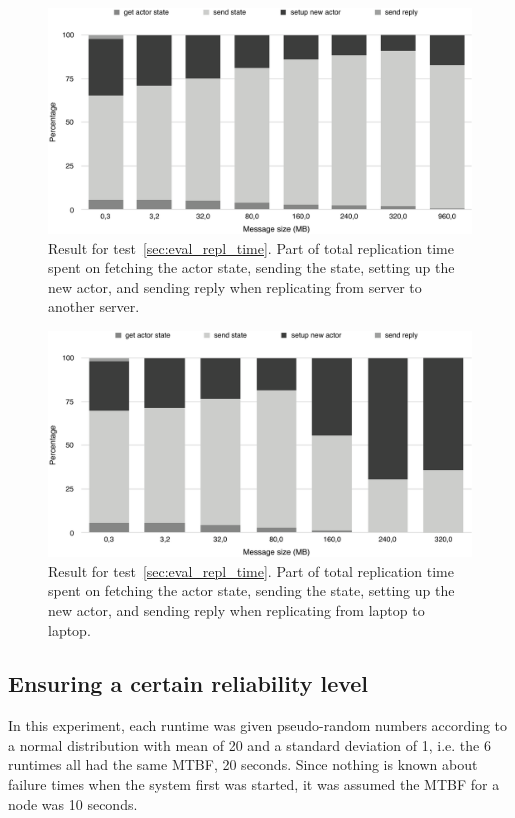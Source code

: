 \documentclass{cslthse-msc}
\begin{document}
\begin{figure}[!hbt]
\centering
\includegraphics[scale=0.5]{images/results/replication_time_percentages_server.pdf} 
\caption{Result for test~\ref{sec:eval_repl_time}. Part of total replication time spent on fetching the actor state, sending the state, setting up the new actor, and sending reply when replicating from server to another server.}\label{fig:replication_time_percentages_server}
\end{figure}

\begin{figure}[!hbt]
\centering
\includegraphics[scale=0.5]{images/results/replication_time_percentages_laptop.pdf} 
\caption{Result for test~\ref{sec:eval_repl_time}. Part of total replication time spent on fetching the actor state, sending the state, setting up the new actor, and sending reply when replicating from laptop to laptop.}\label{fig:replication_time_percentages_laptop}
\end{figure}

\subsection{Ensuring a certain reliability level} \label{sec:eval_rel_level}
In this experiment, each runtime was given pseudo-random numbers according to a normal distribution with mean of 20 and a standard deviation of 1, i.e. the 6 runtimes all had the same MTBF, 20 seconds. Since nothing is known about failure times when the system first was started, it was assumed the MTBF for a node was 10 seconds.
\end{document}
